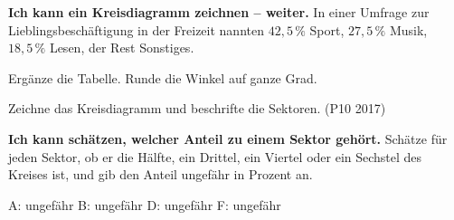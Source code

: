 \begin{aufgabe}{\textbf{Ich kann ein Kreisdiagramm zeichnen – weiter.} In einer Umfrage zur Lieblingsbeschäftigung in der Freizeit nannten $42{,}5\,\%$ Sport, $27{,}5\,\%$ Musik, $18{,}5\,\%$ Lesen, der Rest Sonstiges.}
\noindent\begin{minipage}[t]{0.5\linewidth}
\begin{teile}
\teil Ergänze die Tabelle. Runde die Winkel auf ganze Grad.
\end{teile}
\begin{teile}
\teil Zeichne das Kreisdiagramm und beschrifte die Sektoren. (P10 2017)
\end{teile}
\end{minipage}\hfill
\begin{minipage}[t]{0.45\linewidth}
\vspace{0pt}\kreisleer[2.5]
\end{minipage}
\end{aufgabe}

\begin{aufgabe}{\textbf{Ich kann schätzen, welcher Anteil zu einem Sektor gehört.} Schätze für jeden Sektor, ob er die Hälfte, ein Drittel, ein Viertel oder ein Sechstel des Kreises ist, und gib den Anteil ungefähr in Prozent an.}
\noindent\begin{minipage}[t]{0.48\linewidth}
\centering{}
\end{minipage}\hfill
\begin{minipage}[t]{0.48\linewidth}
\centering{}
\end{minipage}
\begin{teile}
\teil A: \leerfeld \quad ungefähr \leerfeld[\%]
\teil B: \leerfeld \quad ungefähr \leerfeld[\%]
\teil D: \leerfeld \quad ungefähr \leerfeld[\%]
\teil F: \leerfeld \quad ungefähr \leerfeld[\%]
\end{teile}
\end{aufgabe}

